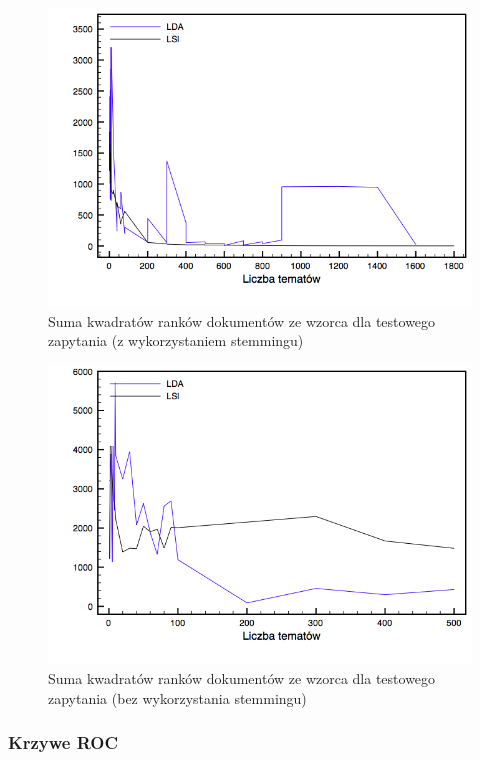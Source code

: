 \documentclass[11pt,a4paper]{article}
\begin{document}
\begin{figure}[h]
\caption{Suma kwadratów ranków dokumentów ze wzorca dla testowego zapytania (z wykorzystaniem stemmingu)}
\label{ranks_stemming_comparison}
\includegraphics[width=\linewidth]{gfx/ranks_stemming.png}
\end{figure}

\begin{figure}[h]
\caption{Suma kwadratów ranków dokumentów ze wzorca dla testowego zapytania (bez wykorzystania stemmingu)}
\label{ranks_no_stemming_comparison}
\includegraphics[width=\linewidth]{gfx/ranks_no_stemming.png}
\end{figure}

\FloatBarrier

\subsubsection{Krzywe ROC}
\end{document}
